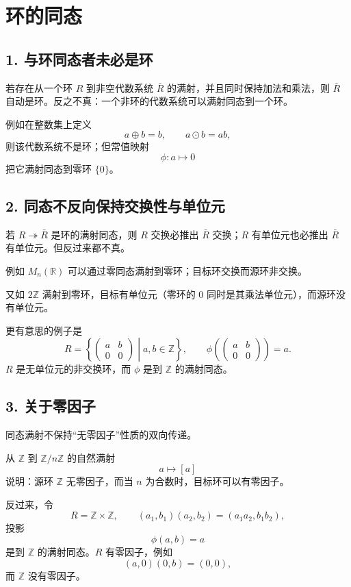 \section{环的同态}

\subsection*{1. 与环同态者未必是环}

若存在从一个环 $R$ 到非空代数系统 $\bar R$ 的满射，并且同时保持加法和乘法，则 $\bar R$ 自动是环。反之不真：一个非环的代数系统可以满射同态到一个环。

例如在整数集上定义
\[
a\oplus b=b,
\qquad
 a\odot b=ab,
\]
则该代数系统不是环；但常值映射
\[
\phi:a\longmapsto0
\]
把它满射同态到零环 $\{0\}$。

\subsection*{2. 同态不反向保持交换性与单位元}

若 $R\twoheadrightarrow\bar R$ 是环的满射同态，则 $R$ 交换必推出 $\bar R$ 交换；$R$ 有单位元也必推出 $\bar R$ 有单位元。但反过来都不真。

例如 $M_n(\mathbb R)$ 可以通过零同态满射到零环；目标环交换而源环非交换。

又如 $2\mathbb Z$ 满射到零环，目标有单位元（零环的 $0$ 同时是其乘法单位元），而源环没有单位元。

更有意思的例子是
\[
R=\left\{\begin{pmatrix}a&b\\0&0\end{pmatrix}\middle|a,b\in\mathbb Z\right\},
\qquad
\phi\!\left(\begin{pmatrix}a&b\\0&0\end{pmatrix}\right)=a.
\]
$R$ 是无单位元的非交换环，而 $\phi$ 是到 $\mathbb Z$ 的满射同态。

\subsection*{3. 关于零因子}

同态满射不保持“无零因子”性质的双向传递。

从 $\mathbb Z$ 到 $\mathbb Z/n\mathbb Z$ 的自然满射
\[
a\longmapsto[a]
\]
说明：源环 $\mathbb Z$ 无零因子，而当 $n$ 为合数时，目标环可以有零因子。

反过来，令
\[
R=\mathbb Z\times\mathbb Z,
\qquad
(a_1,b_1)(a_2,b_2)=(a_1a_2,b_1b_2),
\]
投影
\[
\phi(a,b)=a
\]
是到 $\mathbb Z$ 的满射同态。$R$ 有零因子，例如
\[
(a,0)(0,b)=(0,0),
\]
而 $\mathbb Z$ 没有零因子。

